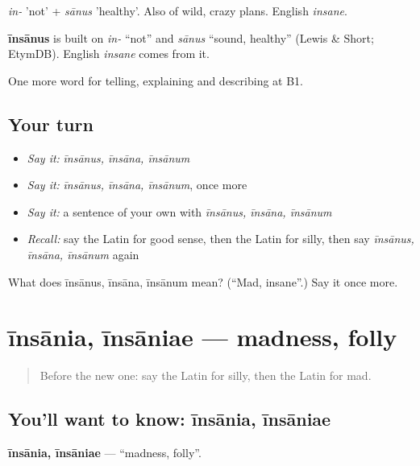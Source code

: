 \emph{in-} 'not' + \emph{sānus} 'healthy'. Also of wild, crazy plans. English \emph{insane}.

\begin{cousinweb}
\textbf{īnsānus} is built on \emph{in-} \textquotedblleft{}not\textquotedblright{} and \emph{sānus} \textquotedblleft{}sound, healthy\textquotedblright{} (Lewis \& Short; EtymDB). English \emph{insane} comes from it.
\end{cousinweb}

\begin{grammarlens}[title={What you've built}]
One more word for telling, explaining and describing at B1.
\end{grammarlens}

\subsection*{Your turn}
\begin{itemize}
\raggedright
  \item \emph{Say it:} \emph{īnsānus, īnsāna, īnsānum}
  \item \emph{Say it:} \emph{īnsānus, īnsāna, īnsānum}, once more
  \item \emph{Say it:} a sentence of your own with \emph{īnsānus, īnsāna, īnsānum}
  \item \emph{Recall:} say the Latin for good sense, then the Latin for silly, then say \emph{īnsānus, īnsāna, īnsānum} again
\end{itemize}

\begin{tcolorbox}[breakable,colback=teal!4,colframe=teal!35!black,title={Before you move on}]
What does īnsānus, īnsāna, īnsānum mean? (\textquotedblleft{}Mad, insane\textquotedblright{}.) Say it once more.
\end{tcolorbox}
\section[īnsānia, īnsāniae]{īnsānia, īnsāniae — madness, folly}

\label{lesson:LA-C510-insania}



\begin{quote}
Before the new one: say the Latin for silly, then the Latin for mad.
\end{quote}

\subsection*{You'll want to know: īnsānia, īnsāniae}
\textbf{īnsānia, īnsāniae} — \textquotedblleft{}madness, folly\textquotedblright{}.


